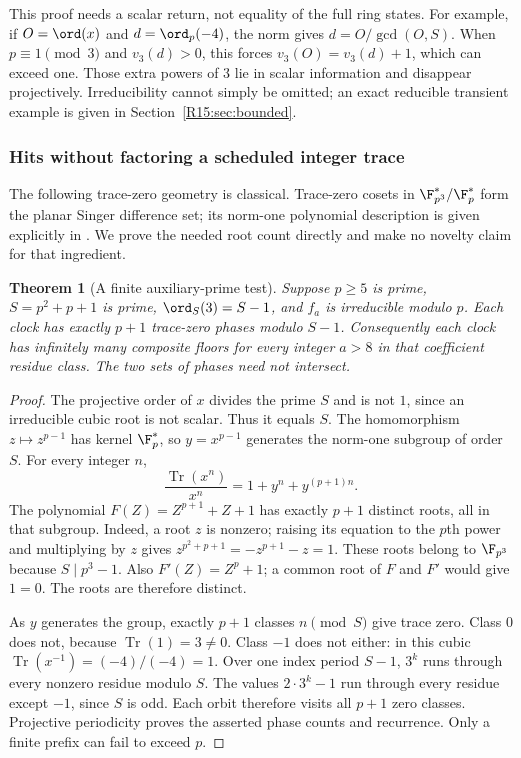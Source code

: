 \documentclass[11pt,a4paper]{article}
\newtheorem{theorem}{Theorem}[section]
\theoremstyle{definition}\newtheorem{definition}[theorem]{Definition}
\theoremstyle{remark}\newtheorem{remark}[theorem]{Remark}
\DeclareMathOperator{\Tr}{Tr}\DeclareMathOperator{\tr}{tr}\DeclareMathOperator{\Nm}{N}
\begin{document}
This proof needs a scalar return, not equality of the full ring states.
For example, if $O=\ord(x)$ and $d=\ord_p(-4)$, the norm gives
$d=O/\gcd(O,S)$. When $p\equiv1\pmod3$ and $v_3(d)>0$,
this forces $v_3(O)=v_3(d)+1$, which can exceed one. Those extra
powers of $3$ lie in scalar information and disappear projectively.
Irreducibility cannot simply be omitted; an exact reducible transient
example is given in Section~\ref{R15:sec:bounded}.

\subsubsection{Hits without factoring a scheduled integer trace}

The following trace-zero geometry is classical. Trace-zero cosets in
$\F_{p^3}^*/\F_p^*$ form the planar Singer difference set; its
norm-one polynomial description is given explicitly in
\cite[Section 1.2 and Corollary 1.2]{MRS}. We prove the needed
root count directly and make no novelty claim for that ingredient.

\begin{theorem}[A finite auxiliary-prime test]\label{R15:thm:singer}
Suppose $p\ge5$ is prime, $S=p^2+p+1$ is prime,
$\ord_S(3)=S-1$, and $f_a$ is irreducible modulo $p$.
Each clock has exactly $p+1$ trace-zero phases modulo $S-1$.
Consequently each clock has infinitely many composite floors for
every integer $a>8$ in that coefficient residue class. The two sets
of phases need not intersect.
\end{theorem}
\begin{proof}
The projective order of $x$ divides the prime $S$ and is not $1$,
since an irreducible cubic root is not scalar. Thus it equals $S$.
The homomorphism $z\mapsto z^{p-1}$ has kernel $\F_p^*$,
so $y=x^{p-1}$ generates the norm-one subgroup of order $S$.
For every integer $n$,
\begin{equation}\label{R15:eq:zeropoly}
 \frac{\Tr(x^n)}{x^n}=1+y^n+y^{(p+1)n}.
\end{equation}
The polynomial $F(Z)=Z^{p+1}+Z+1$ has exactly $p+1$ distinct
roots, all in that subgroup. Indeed, a root $z$ is nonzero; raising
its equation to the $p$th power and multiplying by $z$ gives
$z^{p^2+p+1}=-z^{p+1}-z=1$. These roots belong to $\F_{p^3}$
because $S\mid p^3-1$. Also $F'(Z)=Z^p+1$; a common root of
$F$ and $F'$ would give $1=0$. The roots are therefore distinct.

As $y$ generates the group, exactly $p+1$ classes $n\pmod S$
give trace zero. Class $0$ does not, because $\Tr(1)=3\ne0$.
Class $-1$ does not either: in this cubic
$\Tr(x^{-1})=(-4)/(-4)=1$.
Over one index period $S-1$, $3^k$ runs through every nonzero
residue modulo $S$. The values $2\cdot3^k-1$ run through every
residue except $-1$, since $S$ is odd. Each orbit therefore visits
all $p+1$ zero classes. Projective periodicity proves the asserted
phase counts and recurrence. Only a finite prefix can fail to exceed $p$.
\end{proof}
\end{document}
